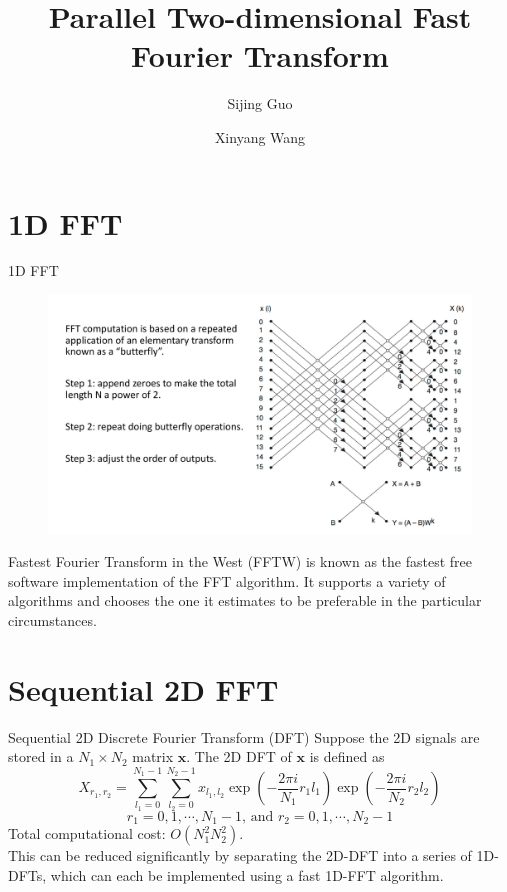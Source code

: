 \documentclass{beamer}
\title{Parallel Two-dimensional Fast Fourier Transform}
\author{Sijing Guo \and Xinyang Wang}
\institute[Courant Institute of Mathematical Sciences] %
{
Courant Institute of Mathematical Sciences
\and Final Project of High Performace Computing}
\begin{document}
\begin{frame}
  \titlepage
\end{frame}



\section{1D FFT}
\begin{frame}{1D FFT}
\begin{figure}
\includegraphics[width=\linewidth]{butterfly.pdf}
\end{figure}
Fastest Fourier Transform in the West (FFTW) is known as the fastest free software implementation of the FFT algorithm. It supports a variety of algorithms and chooses the one it estimates to be preferable in the particular circumstances. 
\end{frame}

\section{Sequential 2D FFT}


\begin{frame}{Sequential 2D Discrete Fourier Transform (DFT)}
Suppose the 2D signals are stored in a $N_1\times N_2$ matrix $\textbf{x}$. The 2D DFT of $\textbf{x}$ is defined as 
$$X_{r_1,r_2}=\sum_{l_1=0}^{N_1-1}\sum_{l_2=0}^{N_2-1}x_{l_1,l_2}\exp({-\frac{2\pi i}{N_1}r_1l_1})\exp({-\frac{2\pi i}{N_2}r_2l_2})$$
$$r_1=0,1,\cdots, N_1-1 \text{, and } r_2=0,1,\cdots,N_2-1$$
Total computational cost: $O(N_1^2N_2^2)$.\\
\vspace{0.5cm}
This can be reduced significantly by separating the 2D-DFT into a series of 1D-DFTs, which can each be implemented using a fast 1D-FFT algorithm.
\end{frame}
\end{document}
